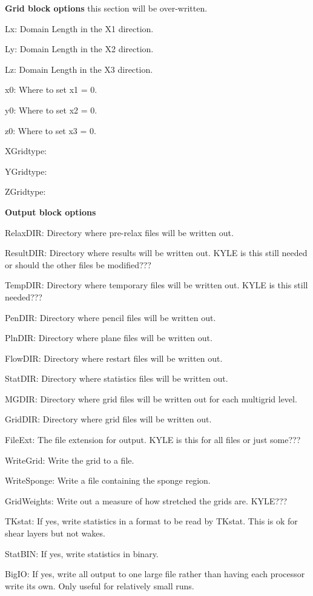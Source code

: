 \textbf{Grid block options}
this section will be over-written.
\begin{description}
  \item Lx: Domain Length in the X1 direction.
  \item Ly: Domain Length in the X2 direction.
  \item Lz: Domain Length in the X3 direction.
  \item x0: Where to set x1 = 0. 
  \item y0: Where to set x2 = 0. 
  \item z0: Where to set x3 = 0. 
  \item XGridtype:
  \item YGridtype:
  \item ZGridtype:
\end{description}

\textbf{Output block options}
\begin{description}
  \item RelaxDIR: Directory where pre-relax files will be written out.
  \item ResultDIR: Directory where results will be written out. KYLE is this still needed or should the other files be modified???
  \item TempDIR: Directory where temporary files will be written out. KYLE is this still needed???
  \item PenDIR: Directory where pencil files will be written out.
  \item PlnDIR: Directory where plane files will be written out.
  \item FlowDIR: Directory where restart files will be written out.
  \item StatDIR: Directory where statistics files will be written out.
  \item MGDIR: Directory where grid files will be written out for each
        multigrid level.
  \item GridDIR: Directory where grid files will be written out.
  \item FileExt: The file extension for output. KYLE is this for all files or just some???
  \item WriteGrid: Write the grid to a file.
  \item WriteSponge: Write a file containing the sponge region.
  \item GridWeights: Write out a measure of how stretched the grids are. KYLE???
  \item TKstat: If yes, write statistics in a format to be read by TKstat. This
        is ok for shear layers but not wakes.
  \item StatBIN: If yes, write statistics in binary.
  \item BigIO: If yes, write all output to one large file rather than
        having each processor write its own. Only useful for relatively
        small runs.
\end{description}

